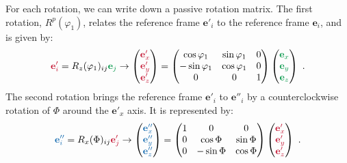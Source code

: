 For each rotation, we can write down a passive rotation matrix.  The first rotation, $R^p(\varphi_1)$, relates the reference
frame \textcolor{OCCarnegieRed}{$\mathbf{e}'_i$} to the reference frame \textcolor{OCGreenThread}{$\mathbf{e}_i$}, and is given by:
\begin{equation}
	\textcolor{OCCarnegieRed}{\mathbf{e}'_i} = R_z(\varphi_1)_{ij} \textcolor{OCGreenThread}{\mathbf{e}_j} \rightarrow \begin{pmatrix}\textcolor{OCCarnegieRed}{\mathbf{e}'_x}\\ \textcolor{OCCarnegieRed}{\mathbf{e}'_y}\\ \textcolor{OCCarnegieRed}{\mathbf{e}'_z}\end{pmatrix} = 
	\begin{pmatrix}\cos\varphi_1&\sin\varphi_1&0\\ -\sin\varphi_1&\cos\varphi_1&0\\ 0&0&1\end{pmatrix}
	\begin{pmatrix}\textcolor{OCGreenThread}{\mathbf{e}_x}\\ \textcolor{OCGreenThread}{\mathbf{e}_y}\\ \textcolor{OCGreenThread}{\mathbf{e}_z}\end{pmatrix}\ . 
\end{equation}
The second rotation brings the reference frame \textcolor{OCCarnegieRed}{$\mathbf{e}'_i$} to \textcolor{OCblue}{$\mathbf{e}''_i$} by a counterclockwise rotation of 
$\Phi$ around the  \textcolor{OCCarnegieRed}{$\mathbf{e}'_x$} axis.  It is represented by:
\begin{equation}
	\textcolor{OCblue}{\mathbf{e}''_i} = R_x(\Phi)_{ij} \textcolor{OCCarnegieRed}{\mathbf{e}'_j} \rightarrow \begin{pmatrix}\textcolor{OCblue}{\mathbf{e}''_x}\\ \textcolor{OCblue}{\mathbf{e}''_y}\\ \textcolor{OCblue}{\mathbf{e}''_z}\end{pmatrix} = 
	\begin{pmatrix}1&0&0\\ 0&\cos\Phi&\sin\Phi\\ 0&-\sin\Phi&\cos\Phi\end{pmatrix}
	\begin{pmatrix}\textcolor{OCCarnegieRed}{\mathbf{e}'_x}\\ \textcolor{OCCarnegieRed}{\mathbf{e}'_y}\\ \textcolor{OCCarnegieRed}{\mathbf{e}'_z}\end{pmatrix}\ . 
\end{equation}

